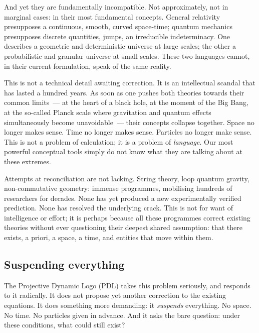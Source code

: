 \documentclass[12pt, a4paper, openright]{book}
\begin{document}
\medskip

And yet they are fundamentally incompatible. Not approximately, not in marginal cases: in their most fundamental concepts. General relativity presupposes a continuous, smooth, curved space-time; quantum mechanics presupposes discrete quantities, jumps, an irreducible indeterminacy. One describes a geometric and deterministic universe at large scales; the other a probabilistic and granular universe at small scales. These two languages cannot, in their current formulation, speak of the same reality.

\medskip

This is not a technical detail awaiting correction. It is an intellectual scandal that has lasted a hundred years. As soon as one pushes both theories towards their common limits~--- at the heart of a black hole, at the moment of the Big Bang, at the so-called Planck scale where gravitation and quantum effects simultaneously become unavoidable~--- their concepts collapse together. Space no longer makes sense. Time no longer makes sense. Particles no longer make sense. This is not a problem of calculation; it is a problem of \emph{language}. Our most powerful conceptual tools simply do not know what they are talking about at these extremes.

\medskip

Attempts at reconciliation are not lacking. String theory, loop quantum gravity, non-commutative geometry: immense programmes, mobilising hundreds of researchers for decades. None has yet produced a new experimentally verified prediction. None has resolved the underlying crack. This is not for want of intelligence or effort; it is perhaps because all these programmes correct existing theories without ever questioning their deepest shared assumption: that there exists, a priori, a space, a time, and entities that move within them.

\subsection*{Suspending everything}

The Projective Dynamic Logo (PDL) takes this problem seriously, and responds to it radically. It does not propose yet another correction to the existing equations. It does something more demanding: it \emph{suspends} everything. No space. No time. No particles given in advance. And it asks the bare question: under these conditions, what could still exist?

\medskip
\end{document}
